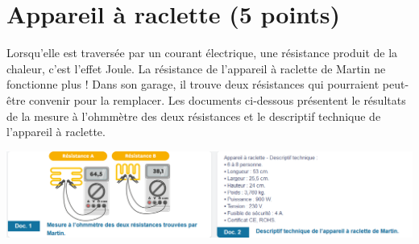 \section{Appareil à raclette (5 points)}

Lorsqu'elle est traversée par un courant électrique, une résistance produit de la chaleur, c'est l'effet Joule.
La résistance de l'appareil à raclette de Martin ne fonctionne plus ! Dans son garage, il trouve deux résistances qui pourraient peut-être convenir pour la remplacer. 
Les documents ci-dessous présentent le résultats de la mesure à l'ohmmètre des deux résistances et le descriptif technique de l'appareil à raclette.
	\begin{center}
		\includegraphics[scale=0.7]{img/docs}
	\end{center}

